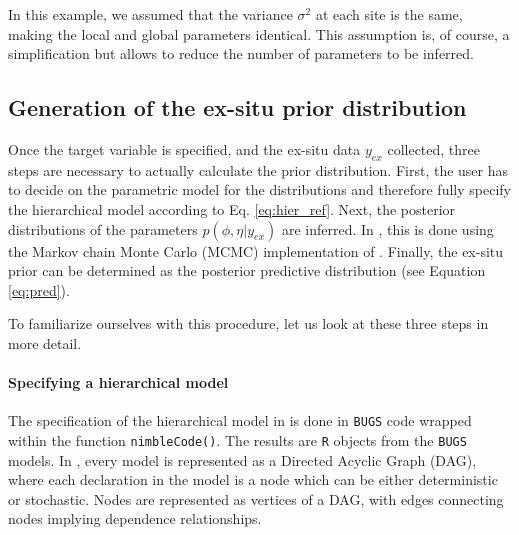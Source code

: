 In this example, we assumed that the variance $\sigma^2$ at each site is the same, making the local and global parameters identical. 
This assumption is, of course, a simplification but allows to reduce the number of parameters to be inferred.


\subsection{Generation of the ex-situ prior distribution}\label{ssec:general-structure}

Once the target variable is specified, and the ex-situ data $y_{ex}$ collected, three steps are necessary to actually calculate the prior distribution. 
First, the user has to decide on the parametric model for the distributions and therefore fully specify the hierarchical model according to Eq. \ref{eq:hier_ref}. 
Next, the posterior distributions of the parameters $p({\phi, \eta}|y_{ex})$ are inferred. 
In , this is done using the Markov chain Monte Carlo (MCMC) implementation of .
Finally, the ex-situ prior can be determined as the posterior predictive distribution (see Equation \ref{eq:pred}). 

To familiarize ourselves with this procedure, let us look at these three steps in more detail.


\paragraph{Specifying a hierarchical model}\label{sssec:implementation}

The specification of the hierarchical model in  is done in \texttt{BUGS} code wrapped within the  function \texttt{nimbleCode()}. 
The results are \texttt{R} objects from the \texttt{BUGS} models. 
In , every model is represented as a Directed Acyclic Graph (DAG), where each declaration in the model is a node which can be either deterministic or stochastic.
Nodes are represented as vertices of a DAG, with edges connecting nodes implying dependence relationships.


